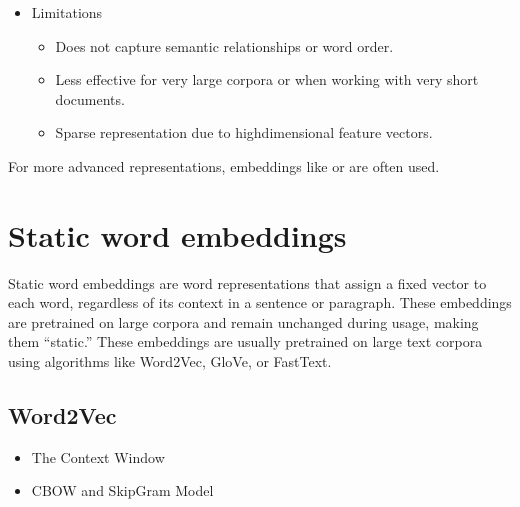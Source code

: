 \documentclass[letterpaper,11pt,english]{sphinxmanual}
\begin{document}
\begin{itemize}
\begin{itemize}
\end{itemize}

\item {} 
\sphinxAtStartPar
Limitations
\begin{itemize}
\item {} 
\sphinxAtStartPar
Does not capture semantic relationships or word order.

\item {} 
\sphinxAtStartPar
Less effective for very large corpora or when working with very short documents.

\item {} 
\sphinxAtStartPar
Sparse representation due to high\sphinxhyphen{}dimensional feature vectors.

\end{itemize}

\end{itemize}

\sphinxAtStartPar
For more advanced representations, embeddings like  or  are often used.


\section{Static word embeddings}
\label{\detokenize{embedding:static-word-embeddings}}
\sphinxAtStartPar
Static word embeddings are word representations that assign a fixed vector to each word,
regardless of its context in a sentence or paragraph. These embeddings are pre\sphinxhyphen{}trained on
large corpora and remain unchanged during usage, making them “static.” These embeddings are
usually pre\sphinxhyphen{}trained on large text corpora using algorithms like Word2Vec, GloVe, or FastText.


\subsection{Word2Vec}
\label{\detokenize{embedding:word2vec}}\begin{itemize}
\item {} 
\sphinxAtStartPar
The Context Window

\item {} 
\sphinxAtStartPar
CBOW and Skip\sphinxhyphen{}Gram Model

\end{itemize}
\end{document}
